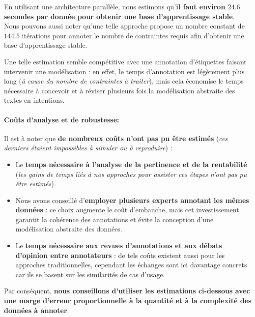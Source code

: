 			En utilisant une architecture parallèle, nous estimons qu'\textbf{il faut environ $24.6$ secondes par donnée pour obtenir une base d'apprentissage stable}.
			Nous pouvons aussi noter qu'une telle approche propose un nombre constant de $144.5$ itérations pour annoter le nombre de contraintes requis afin d'obtenir une base d'apprentissage stable.
			
			Une telle estimation semble compétitive avec une annotation d'étiquettes faisant intervenir une modélisation : en effet, le temps d'annotation est légèrement plus long (\textit{à cause du nombre de contraintes à traiter}), mais cela économise le temps nécessaire à concevoir et à réviser plusieurs fois la modélisation abstraite des textes en intentions.
		
		
		\paragraph{\textcolor{colorSilverLakeBlue}{\faCheckSquare} Coûts d'analyse et de robustesse:}
			
			Il est à noter que \textbf{de nombreux coûts n'ont pas pu être estimés} (\textit{ces derniers étaient impossibles à simuler ou à reproduire}) :
			\begin{itemize}
				\item Le \textbf{temps nécessaire à l'analyse de la pertinence et de la rentabilité}
				(\textit{les gains de temps liés à nos approches pour assister ces étapes n'ont pas pu être estimés}).
				\item Nous avons conseillé d'\textbf{employer plusieurs experts annotant les mêmes données} : ce choix augmente le coût d'embauche, mais cet investissement garantit la cohérence des annotations et évite la conception d'une modélisation abstraite des données.
				\item Le \textbf{temps nécessaire aux revues d'annotations et aux débats d'opinion entre annotateurs} : de tels coûts existent aussi pour les approches traditionnelles, cependant les échanges sont ici davantage concrets car ils se basent sur les similarités de cas d'usage.
			\end{itemize}
			
			Par conséquent, \textbf{nous conseillons d'utiliser les estimations ci-dessous avec une marge d'erreur proportionnelle à la quantité et à la complexité des données à annoter}.
			
